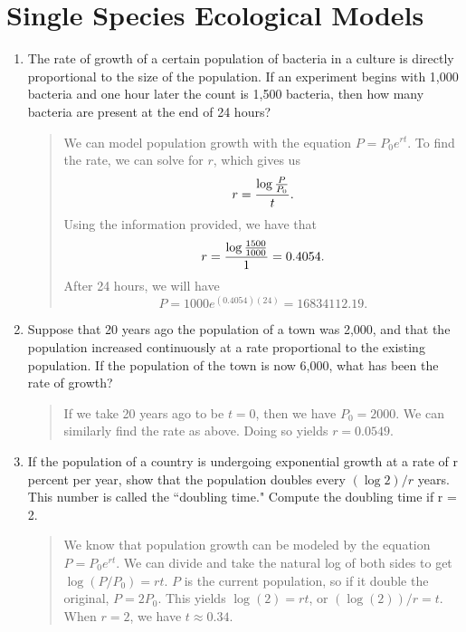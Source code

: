\documentclass{hw}
\begin{document}
\section{Single Species Ecological Models}
\begin{enumerate}
\item The rate of growth of a certain population of bacteria in a culture is directly proportional
to the size of the population. If an experiment begins with 1,000 bacteria and one hour later
the count is 1,500 bacteria, then how many bacteria are present at the end of 24 hours?
\begin{quote}
We can model population growth with the equation $P = P_{0}e^{rt}$. To find the rate, we can solve
for $r$, which gives us
\[
r = {\log{P\over P_{0}}\over t}.
\]
Using the information provided, we have that
\[
r = {\log{1500\over 1000}\over 1} = 0.4054.
\]
After 24 hours, we will have
\[
P = 1000e^{(0.4054)(24)} = 16834112.19.
\]
\end{quote}

\item Suppose that 20 years ago the population of a town was 2,000, and that the population increased
continuously at a rate proportional to the existing population. If the population of the town is now
6,000, what has been the rate of growth?
\begin{quote}
If we take 20 years ago to be $t=0$, then we have $P_{0} = 2000$. We can similarly find the rate
as above. Doing so yields $r = 0.0549$.
\end{quote}

\item If the population of a country is undergoing exponential growth at a rate of r percent per
year, show that the population doubles every $(\log{2})/r$ years. This number is called the
``doubling time." Compute the doubling time if r = 2.
\begin{quote}
We know that population growth can be modeled by the equation $P = P_{0}e^{rt}$. We can divide and
take the natural log of both sides to get $\log{(P/P_{0})} = rt$. $P$ is the current population,
so if it double the original, $P = 2P_{0}$. This yields $\log{(2)} = rt$, or $(\log{(2)})/r = t$.
When $r=2$, we have $t \approx 0.34$.


\end{quote}
\end{enumerate}
\end{document}
